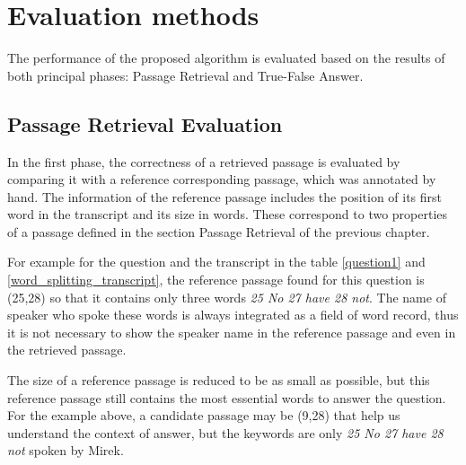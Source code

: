 \chapter{Evaluation methods}

The performance of the proposed algorithm is evaluated based on the results of both principal phases: Passage Retrieval and True-False Answer. 




\section{Passage Retrieval Evaluation}
In the first phase, the correctness of a retrieved passage is evaluated by comparing it with a reference corresponding passage, which was annotated by hand. The information of the reference passage includes the position of its first word in the transcript and its size in words. These correspond to two properties of a passage defined in the section Passage Retrieval of the previous chapter. 

For example for the question and the transcript in the table \ref{question1} and \ref{word_splitting_transcript}, the reference passage found for this question is (25,28) so that it contains only three words \textit{25 No 27 have 28 not}. The name of speaker who spoke these words is always integrated as a field of word record, thus it is not necessary to show the speaker name in the reference passage and even in the retrieved passage.

The size of a reference passage is reduced to be as small as possible, but this reference passage still contains the most essential words to answer the question. For the example above, a candidate passage may be (9,28) that help us understand the context of answer, but the keywords are only \textit{25 No 27 have 28 not} spoken by Mirek.

